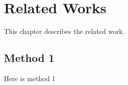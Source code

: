 \documentclass[../main/thesis.tex]{subfiles}
\begin{document}
\chapter{Related Works}
\label{ch:2}
This chapter describes the related work.

\section{Method 1}
Here is method 1

\bib
\end{document}

